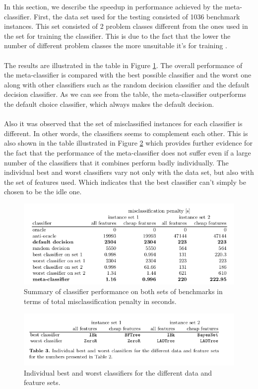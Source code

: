 In this section, we describe the speedup in performance achieved by the meta-classifier. First, the data set used for the testing consisted of 1036 benchmark instances. This set consisted of 2 problem classes different from  the ones used in the set for training the classifier. This is due to the fact that the lower the number of different problem classes the more unsuitable it's for training \cite{ml:csd}.
\\\\
The results are illustrated in the table in Figure \ref{fig:results}. The overall performance of the meta-classifier is compared with the best possible classifier and the worst one along with other classifiers such as the random decision classifier and the default decision classifier. As we can see from the table, the meta-classifier outperforms the default choice classifier, which always makes the default decision.
\\\\
Also it was observed that the set of misclassified instances for each classifier is different. In other words, the classifiers seems to complement each other. This is also shown in the table illustrated in Figure \ref{fig2:results} which provides further evidence for the fact that the performance of the meta-classifier does not suffer even if a large number of the classifiers that it combines perform badly individually. The individual best and worst classifiers vary not only with the data set, but also with the set of features used. Which indicates that the best classifier can't simply be chosen to be the idle one\cite{ml:csd}.

\clearpage
\begin{figure}[h!]
  \vspace{1 cm}
  \includegraphics[width=1.0\textwidth]{images/results.png}
  \caption[ ]{Summary of classifier performance on both sets of benchmarks in terms of
total misclassification penalty in seconds.}
  \label{fig:results}
\end{figure}

\begin{figure}[h!]
  \vspace{1 cm}
  \includegraphics[width=1.0\textwidth]{images/results2.png}
  \caption[ ]{Individual best and worst classifiers for the different data and feature sets.}
  \label{fig2:results}
\end{figure}
